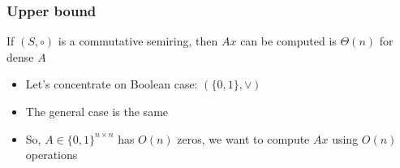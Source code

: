 \documentclass{beamer}
\begin{document}
\begin{frame}
\frametitle{Upper bound}

\begin{theorem}[restated]
If $(S,\circ)$ is a commutative semiring, then $Ax$ can be computed is $\Theta(n)$ for dense $A$
\end{theorem}


\begin{itemize}
\item Let's concentrate on Boolean case: $(\{0,1\},\vee)$
\item The general case is the same
\item So, $A \in \{0,1\}^{n\times n}$ has $O(n)$ zeros, we want to compute $Ax$ using $O(n)$ operations
\end{itemize}


\end{frame}
\end{document}
